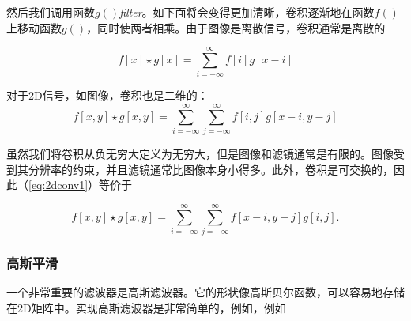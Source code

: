
然后我们调用函数$g()$\emph{filter}。如下面将会变得更加清晰，卷积逐渐地在函数$f()$上移动函数$g()$，同时使两者相乘。由于图像是离散信号，卷积通常是离散的

\begin{equation}
f[x]\star g[x]=\sum_{i=-\infty}^{\infty}f[i]g[x-i]
\end{equation} 


对于2D信号，如图像，卷积也是二维的：
\begin{equation}\label{eq:2dconv1}
f[x,y]\star g[x,y]=\sum_{i=-\infty}^{\infty}\sum_{j=-\infty}^{\infty}f[i,j]g[x-i,y-j]
\end{equation}


虽然我们将卷积从负无穷大定义为无穷大，但是图像和滤镜通常是有限的。图像受到其分辨率的约束，并且滤镜通常比图像本身小得多。此外，卷积是可交换的，因此（\ref{eq:2dconv1}）等价于

\begin{equation}\label{eq:2dconv2}
f[x,y]\star g[x,y]=\sum_{i=-\infty}^{\infty}\sum_{j=-\infty}^{\infty}f[x-i,y-j]g[i,j].
\end{equation}


\subsubsection{高斯平滑}
一个非常重要的滤波器是高斯滤波器。它的形状像高斯贝尔函数，可以容易地存储在2D矩阵中。实现高斯滤波器是非常简单的，例如，例如



